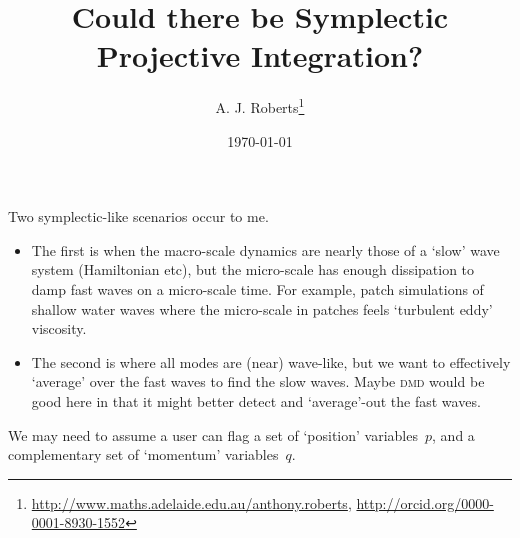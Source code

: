 \documentclass[11pt,a5paper]{article}
\title{Could there be Symplectic Projective Integration?}
\author{A. J. Roberts\thanks{%
\url{http://www.maths.adelaide.edu.au/anthony.roberts},
\url{http://orcid.org/0000-0001-8930-1552}}}
\date{\today}
\begin{document}
\maketitle

Two symplectic-like scenarios occur to me.  \begin{itemize}
\item The first is when the macro-scale dynamics are nearly those of a `slow' wave system (Hamiltonian etc), but the micro-scale has enough dissipation to damp fast waves on a micro-scale time.
For example, patch simulations of shallow water waves where the micro-scale in patches feels `turbulent eddy' viscosity.
\item The second is where all modes are (near) wave-like, but we want to effectively `average' over the fast waves to find the slow waves.
Maybe \textsc{dmd} would be good here in that it might better detect and `average'-out the fast waves.
\end{itemize}

We may need to assume a user can flag a set of `position' variables~\(p\), and a complementary set of `momentum' variables~\(q\).
\end{document}
